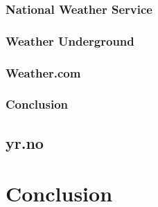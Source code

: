 \subsubsection{National Weather Service}

\subsubsection{Weather Underground}

\subsubsection{Weather.com}

\subsubsection{Conclusion}

\subsection{yr.no}

\section{Conclusion}
